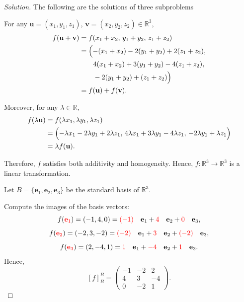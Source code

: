 \documentclass[12pt]{article}
\newenvironment{solution}
{\begin{proof}[Solution]}
{\end{proof}}
\begin{document}
\begin{solution}
The following are the solutions of three subproblems

\medskip


For any $\mathbf{u}=(x_1,y_1,z_1)$, $\mathbf{v}=(x_2,y_2,z_2)\in\mathbb{R}^3$,
\[
\begin{aligned}
f(\mathbf{u}+\mathbf{v})
&=
f(x_1+x_2,\,
y_1+y_2,\,
z_1+z_2) \\
&=
\Bigl(
-(x_1+x_2)-2(y_1+y_2)+2(z_1+z_2),\\
&\qquad
4(x_1+x_2)+3(y_1+y_2)-4(z_1+z_2),\\
&\qquad
-2(y_1+y_2)+(z_1+z_2)
\Bigr) \\
&=
f(\mathbf{u})+f(\mathbf{v}).
\end{aligned}
\]

Moreover, for any $\lambda\in\mathbb{R}$,
\[
\begin{aligned}
f(\lambda\mathbf{u})
&=
f(\lambda x_1,\lambda y_1,\lambda z_1)   \\
&=
\Bigl(
-\lambda x_1-2\lambda y_1+2\lambda z_1,\,
4\lambda x_1+3\lambda y_1-4\lambda z_1,\,
-2\lambda y_1+\lambda z_1
\Bigr)    \\
&=
\lambda f(\mathbf{u}).
\end{aligned}
\]

Therefore, $f$ satisfies both additivity and homogeneity. Hence, $f:\mathbb{R}^3\to\mathbb{R}^3$
is a linear transformation.

\medskip

Let $B=\{\mathbf e_1,\mathbf e_2,\mathbf e_3\}$ be the standard basis of $\mathbb R^3$.

Compute the images of the basis vectors:
\[
f(\textcolor{red}{\mathbf e_1})=(-1,4,0)=\textcolor{red}{(-1)}\quad \mathbf e_1+\textcolor{red}{4}\quad \mathbf e_2+\textcolor{red}{0}\quad \mathbf e_3,
\]
\[
f(\textcolor{red}{\mathbf e_2})=(-2,3,-2)=\textcolor{red}{(-2)}\quad \mathbf e_1+\textcolor{red}{3}\quad \mathbf e_2+\textcolor{red}{(-2)}\quad \mathbf e_3,
\]
\[
f(\textcolor{red}{\mathbf e_3})=(2,-4,1)=\textcolor{red}{1}\quad \mathbf e_1+\textcolor{red}{-4}\quad \mathbf e_2+\textcolor{red}{1}\quad \mathbf e_3.
\]
Hence,
\[
[f]_B^B=
\begin{pmatrix}
-1&-2&2\\
4&3&-4\\
0&-2&1
\end{pmatrix}.
\]

\medskip



\end{solution}
\end{document}
